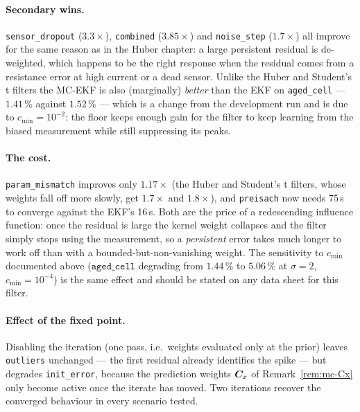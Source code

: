 \paragraph{Secondary wins.}  \texttt{sensor\_dropout} ($3.3\times$), \texttt{combined}
($3.85\times$) and \texttt{noise\_step} ($1.7\times$) all improve for the same reason as in the
Huber chapter: a large persistent residual is de-weighted, which happens to be the right response
when the residual comes from a resistance error at high current or a dead sensor.  Unlike the Huber
and Student's t filters the MC-EKF is also (marginally) \emph{better} than the EKF on
\texttt{aged\_cell} --- $1.41\,\%$ against $1.52\,\%$ --- which is a change from the development
run and is due to $c_{\min}=10^{-2}$: the floor keeps enough gain for the filter to keep learning
from the biased measurement while still suppressing its peaks.

\paragraph{The cost.}  \texttt{param\_mismatch} improves only $1.17\times$ (the Huber and Student's
t filters, whose weights fall off more slowly, get $1.7\times$ and $1.8\times$), and
\texttt{preisach} now needs 75\,s to converge against the EKF's 16\,s.  Both are the price of a
redescending influence function: once the residual is large the kernel weight collapses and the
filter simply stops using the measurement, so a \emph{persistent} error takes much longer to work
off than with a bounded-but-non-vanishing weight.  The sensitivity to $c_{\min}$ documented above
($\texttt{aged\_cell}$ degrading from $1.44\,\%$ to $5.06\,\%$ at $\sigma=2$, $c_{\min}=10^{-4}$)
is the same effect and should be stated on any data sheet for this filter.

\paragraph{Effect of the fixed point.}  Disabling the iteration (one pass, i.e.\ weights evaluated
only at the prior) leaves \texttt{outliers} unchanged --- the first residual already identifies the
spike --- but degrades \texttt{init\_error}, because the prediction weights $\bm{C}_x$ of
Remark~\ref{rem:mc-Cx} only become active once the iterate has moved.  Two iterations recover the
converged behaviour in every scenario tested.

